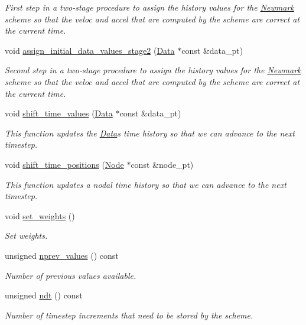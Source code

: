 \begin{DoxyCompactItemize}
\begin{DoxyCompactList}\small\item\em First step in a two-\/stage procedure to assign the history values for the \hyperlink{classoomph_1_1Newmark}{Newmark} scheme so that the veloc and accel that are computed by the scheme are correct at the current time. \end{DoxyCompactList}\item 
void \hyperlink{classoomph_1_1Newmark_a7bc09dd3b0ede9ebbb6b0b1488751301}{assign\+\_\+initial\+\_\+data\+\_\+values\+\_\+stage2} (\hyperlink{classoomph_1_1Data}{Data} $\ast$const \&data\+\_\+pt)
\begin{DoxyCompactList}\small\item\em Second step in a two-\/stage procedure to assign the history values for the \hyperlink{classoomph_1_1Newmark}{Newmark} scheme so that the veloc and accel that are computed by the scheme are correct at the current time. \end{DoxyCompactList}\item 
void \hyperlink{classoomph_1_1Newmark_a3f8606d569f947669006b9b079ac4c82}{shift\+\_\+time\+\_\+values} (\hyperlink{classoomph_1_1Data}{Data} $\ast$const \&data\+\_\+pt)
\begin{DoxyCompactList}\small\item\em This function updates the \hyperlink{classoomph_1_1Data}{Data}\textquotesingle{}s time history so that we can advance to the next timestep. \end{DoxyCompactList}\item 
void \hyperlink{classoomph_1_1Newmark_af56a2965f66e9a181b336e11cc613b21}{shift\+\_\+time\+\_\+positions} (\hyperlink{classoomph_1_1Node}{Node} $\ast$const \&node\+\_\+pt)
\begin{DoxyCompactList}\small\item\em This function updates a nodal time history so that we can advance to the next timestep. \end{DoxyCompactList}\item 
void \hyperlink{classoomph_1_1Newmark_ad175de47f064359fa319a11088b759aa}{set\+\_\+weights} ()
\begin{DoxyCompactList}\small\item\em Set weights. \end{DoxyCompactList}\item 
unsigned \hyperlink{classoomph_1_1Newmark_a4628c97b9f580d0888cb911caf28b54f}{nprev\+\_\+values} () const
\begin{DoxyCompactList}\small\item\em Number of previous values available. \end{DoxyCompactList}\item 
unsigned \hyperlink{classoomph_1_1Newmark_a47895694925d86886ecd03a7e37906fa}{ndt} () const
\begin{DoxyCompactList}\small\item\em Number of timestep increments that need to be stored by the scheme. \end{DoxyCompactList}\end{DoxyCompactItemize}
